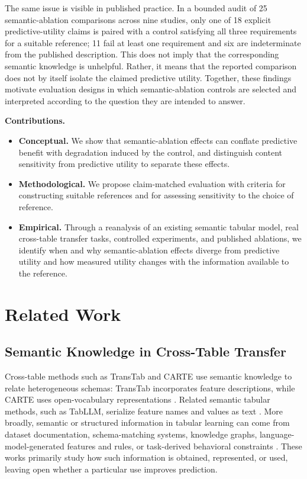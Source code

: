 \documentclass{article} %
\begin{document}
The same issue is visible in published practice. 
In a bounded audit of 25 semantic-ablation comparisons across nine studies, only one of 18 explicit predictive-utility claims is paired with a control satisfying all three requirements for a suitable reference; 11 fail at least one requirement and six are indeterminate from the published description. 
This does not imply that the corresponding semantic knowledge is unhelpful.
Rather, it means that the reported comparison does not by itself isolate the claimed predictive utility. 
Together, these findings motivate evaluation designs in which semantic-ablation controls are selected and interpreted according to the question they are intended to answer.  

\noindent\textbf{Contributions.}
\begin{itemize}[leftmargin=1.2em, labelsep=0.4em,
                itemsep=1pt, topsep=1pt, parsep=0pt, partopsep=0pt]

\item \textbf{Conceptual.} 
We show that semantic-ablation effects can conflate predictive benefit with degradation induced by the control, and distinguish content sensitivity from predictive utility to separate these effects. 
\item \textbf{Methodological.} 
We propose claim-matched evaluation with criteria for constructing suitable references and for assessing sensitivity to the choice of reference.  
\item \textbf{Empirical.} 
Through a reanalysis of an existing semantic tabular model, real cross-table transfer tasks, controlled experiments, and published ablations, we identify when and why semantic-ablation effects diverge from predictive utility and how measured utility changes with the information available to the reference. 

\end{itemize}

\section{Related Work}

\subsection{Semantic Knowledge in Cross-Table Transfer}

Cross-table methods such as TransTab and CARTE use semantic knowledge to relate heterogeneous schemas: TransTab incorporates feature descriptions, while CARTE uses open-vocabulary representations \citep{wang2022transtab,kim2024carte}. Related semantic tabular methods, such as TabLLM, serialize feature names and values as text \citep{hegselmann2023tabllm}.
More broadly, semantic or structured information in tabular learning can come from dataset documentation, schema-matching systems, knowledge graphs, language-model-generated features and rules, or task-derived behavioral constraints \citep{pang2015biobankconnect,li2025harmonization,ruiz2023plato,han2024featllm,kim2025kinematics}.
These works primarily study how such information is obtained, represented, or used, leaving open whether a particular use improves prediction.
\end{document}
